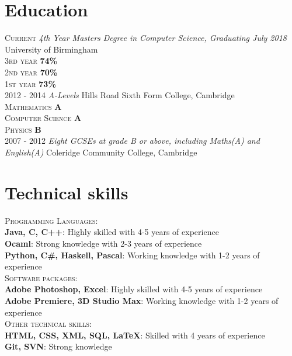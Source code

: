 \documentclass[a4paper, 10pt]{article}
\newcommand\tab[1][1cm]{\hspace*{#1}}
\begin{document}
\section{Education}
\textsc{Current} \emph{4th Year Masters Degree in Computer Science, Graduating July 2018} University of Birmingham\\
 \tab\textsc{3rd year} \textbf{74\%} \\
 \tab\textsc{2nd year} \textbf{70\%} \\
 \tab\textsc{1st year} \textbf{73\%}\\
\textsc{2012 - 2014} \emph{A-Levels} Hills Road Sixth Form College, Cambridge \\
	\tab\textsc{Mathematics} \textbf{A} \\
	\tab\textsc{Computer Science} \textbf{A} \\
	\tab\textsc{Physics} \textbf{B}\\
\textsc{2007 - 2012} \emph{Eight GCSEs at grade B or above, including Maths(A) and English(A)} Coleridge Community College, Cambridge

\section{Technical skills}
 \textsc{Programming Languages:}\\
 \tab\textbf{Java, C, C++}: Highly skilled with 4-5 years of experience\\
 \tab\textbf{Ocaml}: Strong knowledge with 2-3 years of experience\\
 \tab\textbf{Python, C\#, Haskell, Pascal}: Working knowledge with 1-2 years of experience\\
 \textsc{Software packages:}\\
 \tab\textbf{Adobe Photoshop, Excel}: Highly skilled with 4-5 years of experience\\
 \tab\textbf{Adobe Premiere, 3D Studio Max}: Working knowledge with 1-2 years of experience\\
 \textsc{Other technical skills:}\\
 \tab\textbf{HTML, CSS, XML, SQL, LaTeX}: Skilled with 4 years of experience\\
 \tab\textbf{Git, SVN}: Strong knowledge

\end{document}
